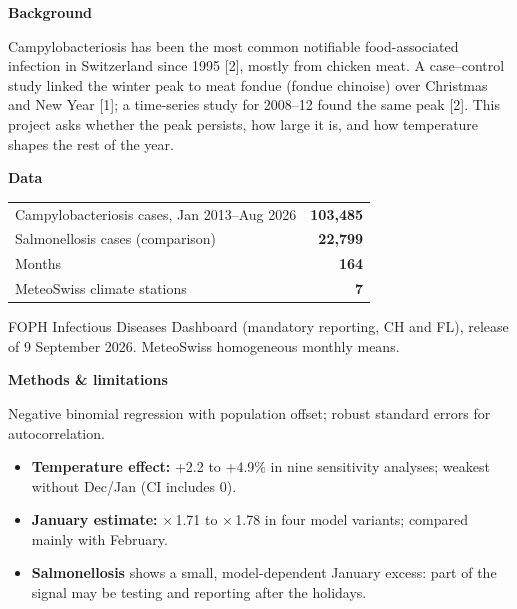 \documentclass{article}
\newcommand{\Small}{\fontsize{15.5}{20}\selectfont\color{ink2}}
\newcommand{\Head}{\fontsize{26}{30}\selectfont\bfseries}
\newcommand{\panelhead}[1]{{\Head #1}\par\vspace{2pt}{\color{rule}\rule{\linewidth}{1.2pt}}\par\vspace{3pt}}
\begin{document}
\vspace{15pt}
\begin{tcbraster}[raster columns=3,raster equal height,raster column skip=18pt,raster every box/.style={fontupper=\fontsize{17.5}{22.5}\selectfont}]
\begin{tcolorbox}[panel]
\panelhead{Background}
Campylobacteriosis has been the most common notifiable food-associated infection in Switzerland since 1995 [2], mostly from chicken meat. A case--control study linked the winter peak to meat fondue (fondue chinoise) over Christmas and New Year [1]; a time-series study for 2008--12 found the same peak [2]. This project asks whether the peak persists, how large it is, and how temperature shapes the rest of the year.
\end{tcolorbox}
\begin{tcolorbox}[panel]
\panelhead{Data}
{\Small
\begin{tabularx}{\linewidth}{@{}X r@{}}
Campylobacteriosis cases, Jan 2013--Aug 2026 & \textbf{\color{ink}103,485}\\
Salmonellosis cases (comparison) & \textbf{\color{ink}22,799}\\
Months & \textbf{\color{ink}164}\\
MeteoSwiss climate stations & \textbf{\color{ink}7}\\
\bottomrule
\end{tabularx}\par}\vspace{4pt}
FOPH Infectious Diseases Dashboard (mandatory reporting, CH and FL), release of 9 September 2026. MeteoSwiss homogeneous monthly means.
\end{tcolorbox}
\begin{tcolorbox}[panel]
\panelhead{Methods \& limitations}
Negative binomial regression with population offset; robust standard errors for autocorrelation.\par\vspace{2pt}
\begin{itemize}
\item \textbf{Temperature effect:} +2.2 to +4.9\% in nine sensitivity analyses; weakest without Dec/Jan (CI includes 0).
\item \textbf{January estimate:} ×\,1.71 to ×\,1.78 in four model variants; compared mainly with February.
\item \textbf{Salmonellosis} shows a small, model-dependent January excess: part of the signal may be testing and reporting after the holidays.
\end{itemize}
\end{tcolorbox}
\end{tcbraster}
\end{document}
